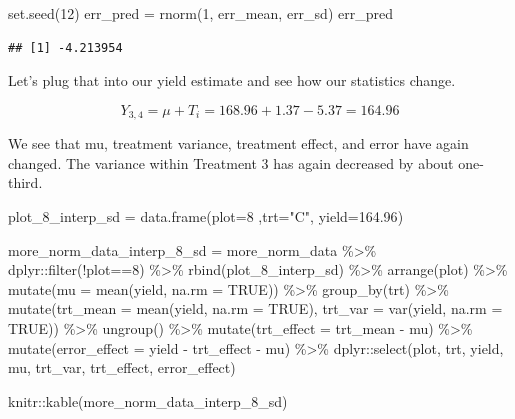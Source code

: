 \documentclass[
]{book}
\newenvironment{Shaded}{\begin{snugshade}}{\end{snugshade}}
\newcommand{\AttributeTok}[1]{\textcolor[rgb]{0.77,0.63,0.00}{#1}}
\newcommand{\ConstantTok}[1]{\textcolor[rgb]{0.00,0.00,0.00}{#1}}
\newcommand{\DecValTok}[1]{\textcolor[rgb]{0.00,0.00,0.81}{#1}}
\newcommand{\FloatTok}[1]{\textcolor[rgb]{0.00,0.00,0.81}{#1}}
\newcommand{\FunctionTok}[1]{\textcolor[rgb]{0.00,0.00,0.00}{#1}}
\newcommand{\NormalTok}[1]{#1}
\newcommand{\OtherTok}[1]{\textcolor[rgb]{0.56,0.35,0.01}{#1}}
\newcommand{\SpecialCharTok}[1]{\textcolor[rgb]{0.00,0.00,0.00}{#1}}
\newcommand{\StringTok}[1]{\textcolor[rgb]{0.31,0.60,0.02}{#1}}
\begin{document}
\begin{Shaded}
\begin{Highlighting}[]
\FunctionTok{set.seed}\NormalTok{(}\DecValTok{12}\NormalTok{)}
\NormalTok{err\_pred }\OtherTok{=} \FunctionTok{rnorm}\NormalTok{(}\DecValTok{1}\NormalTok{, err\_mean, err\_sd)}
\NormalTok{err\_pred}
\end{Highlighting}
\end{Shaded}

\begin{verbatim}
## [1] -4.213954
\end{verbatim}

Let's plug that into our yield estimate and see how our statistics change.

\[ Y_{3,4} = \mu + T_i = 168.96 + 1.37 - 5.37 = 164.96 \]

We see that mu, treatment variance, treatment effect, and error have again changed. The variance within Treatment 3 has again decreased by about one-third.

\begin{Shaded}
\begin{Highlighting}[]
\NormalTok{plot\_8\_interp\_sd }\OtherTok{=} \FunctionTok{data.frame}\NormalTok{(}\AttributeTok{plot=}\DecValTok{8}\NormalTok{ ,}\AttributeTok{trt=}\StringTok{"C"}\NormalTok{, }\AttributeTok{yield=}\FloatTok{164.96}\NormalTok{)}

\NormalTok{more\_norm\_data\_interp\_8\_sd }\OtherTok{=}\NormalTok{ more\_norm\_data }\SpecialCharTok{\%\textgreater{}\%}
\NormalTok{  dplyr}\SpecialCharTok{::}\FunctionTok{filter}\NormalTok{(}\SpecialCharTok{!}\NormalTok{plot}\SpecialCharTok{==}\DecValTok{8}\NormalTok{) }\SpecialCharTok{\%\textgreater{}\%}
  \FunctionTok{rbind}\NormalTok{(plot\_8\_interp\_sd) }\SpecialCharTok{\%\textgreater{}\%}
  \FunctionTok{arrange}\NormalTok{(plot) }\SpecialCharTok{\%\textgreater{}\%}
  \FunctionTok{mutate}\NormalTok{(}\AttributeTok{mu =} \FunctionTok{mean}\NormalTok{(yield, }\AttributeTok{na.rm =} \ConstantTok{TRUE}\NormalTok{)) }\SpecialCharTok{\%\textgreater{}\%}
  \FunctionTok{group\_by}\NormalTok{(trt) }\SpecialCharTok{\%\textgreater{}\%}
  \FunctionTok{mutate}\NormalTok{(}\AttributeTok{trt\_mean =} \FunctionTok{mean}\NormalTok{(yield, }\AttributeTok{na.rm =} \ConstantTok{TRUE}\NormalTok{),}
         \AttributeTok{trt\_var =} \FunctionTok{var}\NormalTok{(yield, }\AttributeTok{na.rm =} \ConstantTok{TRUE}\NormalTok{)) }\SpecialCharTok{\%\textgreater{}\%}
  \FunctionTok{ungroup}\NormalTok{() }\SpecialCharTok{\%\textgreater{}\%}
  \FunctionTok{mutate}\NormalTok{(}\AttributeTok{trt\_effect =}\NormalTok{ trt\_mean }\SpecialCharTok{{-}}\NormalTok{ mu) }\SpecialCharTok{\%\textgreater{}\%}
  \FunctionTok{mutate}\NormalTok{(}\AttributeTok{error\_effect =}\NormalTok{ yield }\SpecialCharTok{{-}}\NormalTok{ trt\_effect }\SpecialCharTok{{-}}\NormalTok{ mu) }\SpecialCharTok{\%\textgreater{}\%}
\NormalTok{  dplyr}\SpecialCharTok{::}\FunctionTok{select}\NormalTok{(plot, trt, yield, mu, trt\_var, trt\_effect, error\_effect)}

\NormalTok{knitr}\SpecialCharTok{::}\FunctionTok{kable}\NormalTok{(more\_norm\_data\_interp\_8\_sd)}
\end{Highlighting}
\end{Shaded}
\end{document}
